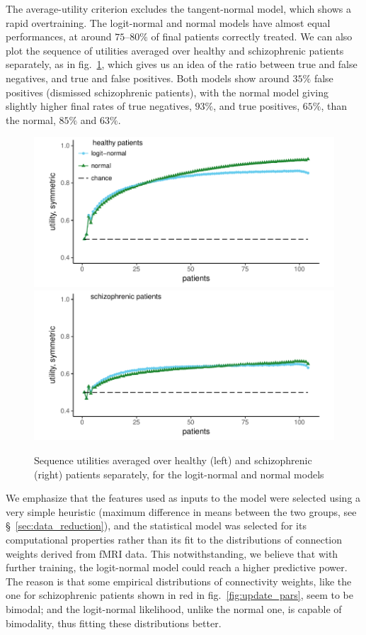 \documentclass[%
]{frontiersSCNS-nologo} %
\newcommand*{\sect}{\S} %
\newcommand*{\fig}{fig.} %
\renewcommand*{\|}{\mathpunct{|}}%
\begin{document}
The average-utility criterion excludes the tangent-normal model, which
shows a rapid overtraining. The logit-normal and normal models have almost
equal performances, at around $75$--$80\%$ of final patients correctly
treated. We can also plot the sequence of utilities averaged over healthy
and schizophrenic patients separately, as in
\fig~\ref{fig:utilities_separate}, which gives us an idea of the ratio
between true and false negatives, and true and false positives. Both models
show around $35\%$ false positives (dismissed schizophrenic patients), with
the normal model giving slightly higher final rates of true negatives,
$93\%$, and true positives, $65\%$, than the normal, $85\%$ and $63\%$.
\begin{figure}[!h]
  \centering
\includegraphics[width=0.75\linewidth]{hits-h2.pdf}\\
\includegraphics[width=0.75\linewidth]{hits-s2.pdf}
\caption{Sequence utilities averaged over healthy (left) and schizophrenic
  (right) patients separately, for the logit-normal and normal models}
\label{fig:utilities_separate}
\end{figure}

We emphasize that the features used as inputs to the model were selected
using a very simple heuristic (maximum difference in means between the two
groups, see \sect~\ref{sec:data_reduction}), and the statistical model was
selected for its computational properties rather than its fit to the
distributions of connection weights derived from fMRI data. This
notwithstanding, we believe that with further training, the logit-normal
model could reach a higher predictive power. The reason is that some
empirical distributions of connectivity weights, like the one for
schizophrenic patients shown in red in \fig~\ref{fig:update_pars}, seem to
be bimodal; and the logit-normal likelihood, unlike the normal one, is
capable of bimodality, thus fitting these distributions better.
\end{document}
